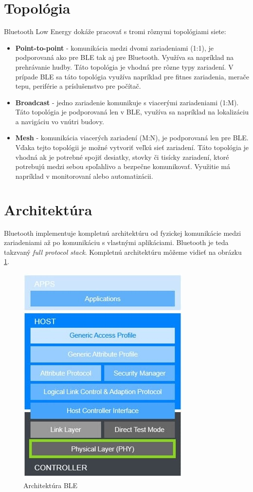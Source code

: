 \section{Topológia}
Bluetooth Low Energy dokáže pracovať s tromi rôznymi topológiami siete:
\begin{itemize}
    \item \textbf{Point-to-point} - komunikácia medzi dvomi zariadeniami (1:1), je podporovaná ako pre BLE tak aj pre Bluetooth. Využíva sa napríklad na prehrávanie hudby. Táto topológia je vhodná pre rôzne typy zariadení. V prípade BLE sa táto topológia využíva napríklad pre fitnes zariadenia, merače tepu, periférie a príslušenstvo pre počítač.
    \item \textbf{Broadcast} - jedno zariadenie komunikuje s viacerými zariadeniami (1:M). Táto topológia je podporovaná len v BLE, využíva sa napríklad na lokalizáciu a navigáciu vo vnútri budovy.  
    \item \textbf{Mesh} - komunikácia viacerých zariadení (M:N), je podporovaná len pre BLE. Vďaka tejto topológii je možné vytvoriť veľkú sieť zariadení. Táto topológia je vhodná ak je potrebné spojiť desiatky, stovky či tisícky zariadení, ktoré potrebujú medzi sebou spoľahlivo a bezpečne komunikovať. Využitie má napríklad v monitorovaní alebo automatizácii.\cite{bluetooth}
\end{itemize}

\section{Architektúra} \label{sec:arch}
Bluetooth implementuje kompletnú architektúru od fyzickej komunikácie medzi zariadeniami až po komunikáciu s vlastnými aplikáciami. Bluetooth je teda takzvaný \textit{full protocol stack}. Kompletnú architektúru môžeme vidieť na obrázku \ref{fig:ble_stack}.

\begin{figure}[ht]
    \centering
    \includegraphics[scale=0.6]{obrazky-figures/bluetooth_le_protocol_stack.jpg}
    \caption[Architektúra BLE]{Architektúra BLE\cite{bluetooth}}
    \label{fig:ble_stack}
\end{figure}

